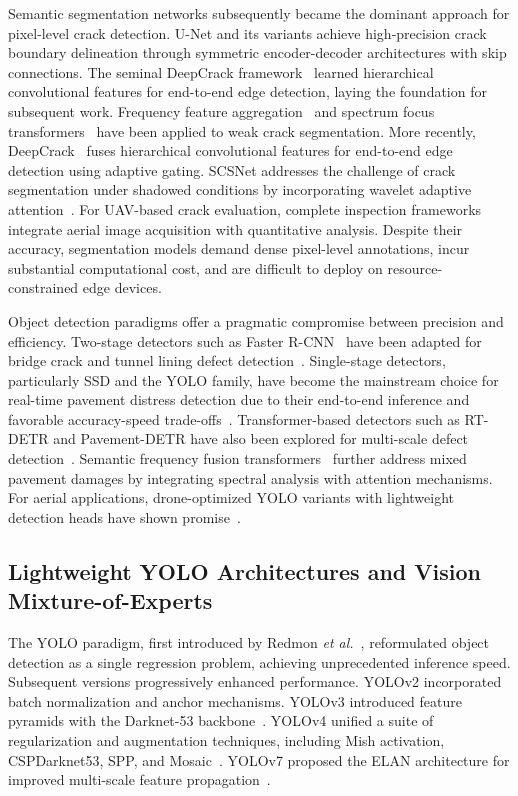 \documentclass{ieeeaccess}
\begin{document}
Semantic segmentation networks subsequently became the dominant approach for pixel-level crack detection. U-Net and its variants achieve high-precision crack boundary delineation through symmetric encoder-decoder architectures with skip connections. The seminal DeepCrack framework~\cite{liu2019deepcrack} learned hierarchical convolutional features for end-to-end edge detection, laying the foundation for subsequent work. Frequency feature aggregation~\cite{zhu2025fdyolo} and spectrum focus transformers~\cite{wang2026highwayfreq} have been applied to weak crack segmentation. More recently, DeepCrack~\cite{wu2025tinydefect} fuses hierarchical convolutional features for end-to-end edge detection using adaptive gating. SCSNet addresses the challenge of crack segmentation under shadowed conditions by incorporating wavelet adaptive attention~\cite{chen2020gabor}. For UAV-based crack evaluation, complete inspection frameworks~\cite{qiu2023uavcrack} integrate aerial image acquisition with quantitative analysis. Despite their accuracy, segmentation models demand dense pixel-level annotations, incur substantial computational cost, and are difficult to deploy on resource-constrained edge devices.

Object detection paradigms offer a pragmatic compromise between precision and efficiency. Two-stage detectors such as Faster R-CNN~\cite{electronics2025ecayolo} have been adapted for bridge crack and tunnel lining defect detection~\cite{liu2024thermaldistress}. Single-stage detectors, particularly SSD and the YOLO family, have become the mainstream choice for real-time pavement distress detection due to their end-to-end inference and favorable accuracy-speed trade-offs~\cite{yang2025yolocompare, kothai2024survey}. Transformer-based detectors such as RT-DETR and Pavement-DETR have also been explored for multi-scale defect detection~\cite{ren2025hpsmyolo}. Semantic frequency fusion transformers~\cite{han2026semenhance} further address mixed pavement damages by integrating spectral analysis with attention mechanisms. For aerial applications, drone-optimized YOLO variants with lightweight detection heads have shown promise~\cite{farooqui2026lafyolov10}.

\subsection{Lightweight YOLO Architectures and Vision Mixture-of-Experts}

The YOLO paradigm, first introduced by Redmon \textit{et al.}~\cite{han2024msyolo}, reformulated object detection as a single regression problem, achieving unprecedented inference speed. Subsequent versions progressively enhanced performance. YOLOv2 incorporated batch normalization and anchor mechanisms. YOLOv3 introduced feature pyramids with the Darknet-53 backbone~\cite{han2024msyolo}. YOLOv4 unified a suite of regularization and augmentation techniques, including Mish activation, CSPDarknet53, SPP, and Mosaic~\cite{han2024msyolo}. YOLOv7 proposed the ELAN architecture for improved multi-scale feature propagation~\cite{xu2025sppfcspc}.
\end{document}
